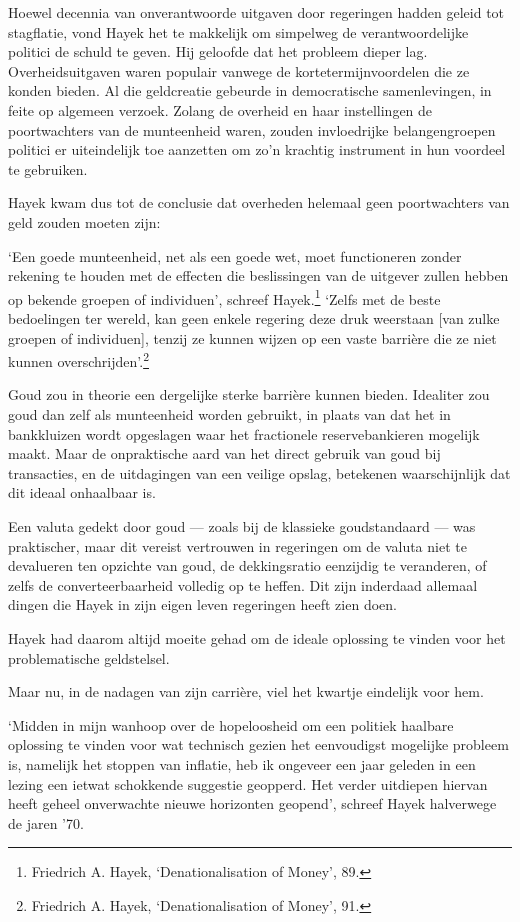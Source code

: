 \documentclass[
  a5paper,
  smalldemyvopaper,11pt,twoside,onecolumn,openright,extrafontsizes]{memoir}
\begin{document}
Hoewel decennia van onverantwoorde uitgaven door regeringen hadden
geleid tot stagflatie, vond Hayek het te makkelijk om simpelweg de
verantwoordelijke politici de schuld te geven. Hij geloofde dat het
probleem dieper lag. Overheidsuitgaven waren populair vanwege de
kortetermijnvoordelen die ze konden bieden. Al die geldcreatie gebeurde
in democratische samenlevingen, in feite op algemeen verzoek. Zolang de
overheid en haar instellingen de poortwachters van de munteenheid waren,
zouden invloedrijke belangengroepen politici er uiteindelijk toe
aanzetten om zo'n krachtig instrument in hun voordeel te gebruiken.

Hayek kwam dus tot de conclusie dat overheden helemaal geen
poortwachters van geld zouden moeten zijn:

`Een goede munteenheid, net als een goede wet, moet functioneren zonder
rekening te houden met de effecten die beslissingen van de uitgever
zullen hebben op bekende groepen of individuen', schreef
Hayek.\footnote{Friedrich A. Hayek, `Denationalisation of Money', 89.}
`Zelfs met de beste bedoelingen ter wereld, kan geen enkele regering
deze druk weerstaan {[}van zulke groepen of individuen{]}, tenzij ze
kunnen wijzen op een vaste barrière die ze niet kunnen
overschrijden'.\footnote{Friedrich A. \hspace{0pt}Hayek,
  `Denationalisation of Money', 91.}

Goud zou in theorie een dergelijke sterke barrière kunnen bieden.
Idealiter zou goud dan zelf als munteenheid worden gebruikt, in plaats
van dat het in bankkluizen wordt opgeslagen waar het fractionele
reservebankieren mogelijk maakt. Maar de onpraktische aard van het
direct gebruik van goud bij transacties, en de uitdagingen van een
veilige opslag, betekenen waarschijnlijk dat dit ideaal onhaalbaar is.

Een valuta gedekt door goud --- zoals bij de klassieke goudstandaard ---
was praktischer, maar dit vereist vertrouwen in regeringen om de valuta
niet te devalueren ten opzichte van goud, de dekkingsratio eenzijdig te
veranderen, of zelfs de converteerbaarheid volledig op te heffen. Dit
zijn inderdaad allemaal dingen die Hayek in zijn eigen leven regeringen
heeft zien doen.

Hayek had daarom altijd moeite gehad om de ideale oplossing te vinden
voor het problematische geldstelsel.

Maar nu, in de nadagen van zijn carrière, viel het kwartje eindelijk
voor hem.

`Midden in mijn wanhoop over de hopeloosheid om een politiek haalbare
oplossing te vinden voor wat technisch gezien het eenvoudigst mogelijke
probleem is, namelijk het stoppen van inflatie, heb ik ongeveer een jaar
geleden in een lezing een ietwat schokkende suggestie geopperd. Het
verder uitdiepen hiervan heeft geheel onverwachte nieuwe horizonten
geopend', schreef Hayek halverwege de jaren '70.
\end{document}
